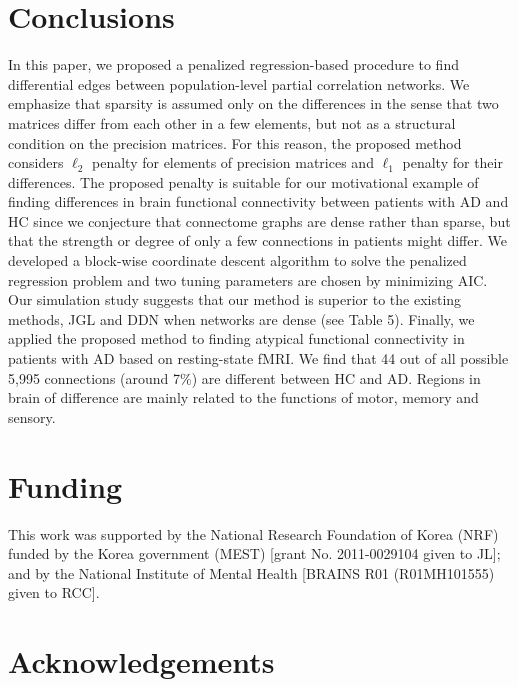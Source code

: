\documentclass[useAMS,usenatbib,referee]{bio}
\begin{document}
{\section{Conclusions}

In this paper, we proposed a penalized regression-based procedure to find differential edges between population-level partial correlation networks. We emphasize that sparsity is assumed only on the differences in the sense that two matrices differ from each other in a few elements, but not as a structural condition on the precision matrices. For this reason, the proposed method considers $\ell_2$ penalty for elements of precision matrices and $\ell_1$ penalty for their differences. The proposed penalty is suitable for our motivational example of finding differences in brain functional connectivity between patients with AD and HC since we conjecture that connectome graphs are dense rather than sparse, but that the strength or degree of only a few connections in patients might differ.  We developed a block-wise coordinate descent algorithm to solve the penalized regression problem and two tuning parameters are chosen by minimizing AIC. Our simulation study suggests that our method is superior to the existing methods, JGL and DDN when networks are dense (see Table 5). 
Finally, we applied the proposed method to finding atypical functional connectivity in patients with AD based on resting-state fMRI. We find that 44 out of all possible 5,995 connections (around 7\%) are different between HC and AD. Regions in brain of difference are mainly related to the functions of motor, memory and sensory. 

\section*{Funding}
This work was supported by the National Research Foundation of Korea (NRF) funded by the Korea government (MEST) [grant No. 2011-0029104 given to JL]; and by the National Institute of Mental Health [BRAINS R01 (R01MH101555) given to RCC]. 

\section*{Acknowledgements}








}
\end{document}
